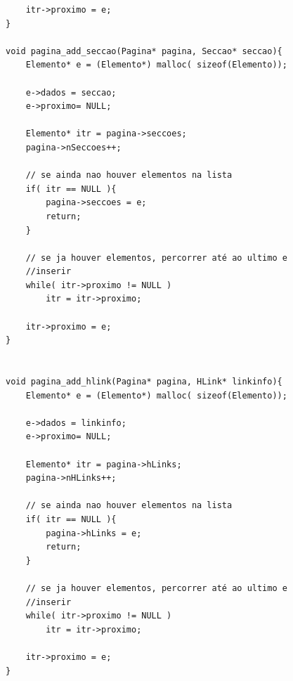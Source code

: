 \documentclass[11pt, a4paper, oneside]{article}
\begin{document}
\begin{verbatim}
    itr->proximo = e;
}

void pagina_add_seccao(Pagina* pagina, Seccao* seccao){
    Elemento* e = (Elemento*) malloc( sizeof(Elemento));

    e->dados = seccao;
    e->proximo= NULL;

    Elemento* itr = pagina->seccoes;
    pagina->nSeccoes++;
    
    // se ainda nao houver elementos na lista
    if( itr == NULL ){
        pagina->seccoes = e;
        return;
    }
    
    // se ja houver elementos, percorrer até ao ultimo e 
    //inserir
    while( itr->proximo != NULL )
        itr = itr->proximo;
    
    itr->proximo = e;
}


void pagina_add_hlink(Pagina* pagina, HLink* linkinfo){
    Elemento* e = (Elemento*) malloc( sizeof(Elemento));

    e->dados = linkinfo;
    e->proximo= NULL;

    Elemento* itr = pagina->hLinks;
    pagina->nHLinks++;
    
    // se ainda nao houver elementos na lista
    if( itr == NULL ){
        pagina->hLinks = e;
        return;
    }
    
    // se ja houver elementos, percorrer até ao ultimo e 
    //inserir
    while( itr->proximo != NULL )
        itr = itr->proximo;
    
    itr->proximo = e;
}

\end{verbatim}

\newpage
\end{document}
